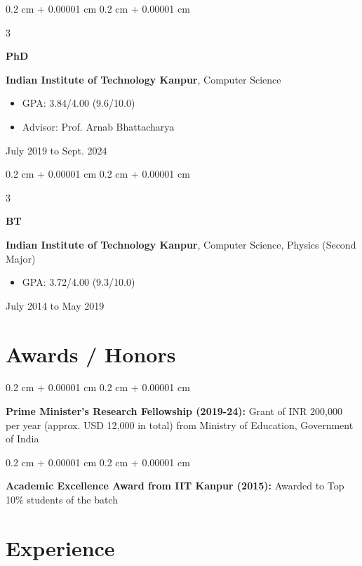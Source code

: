 \documentclass[12pt, letterpaper]{article}
\newenvironment{highlights}{
    \begin{itemize}[
        topsep=0.10 cm,
        parsep=0.10 cm,
        partopsep=0pt,
        itemsep=0pt,
        leftmargin=0.4 cm + 10pt
    ]
}{
    \end{itemize}
} %
\newenvironment{onecolentry}{
    \begin{adjustwidth}{
        0.2 cm + 0.00001 cm
    }{
        0.2 cm + 0.00001 cm
    }
}{
    \end{adjustwidth}
} %
\newenvironment{threecolentry}[3][]{
    \onecolentry
    \def\thirdColumn{#3}
    \setcolumnwidth{1 cm, \fill, 4.5 cm}
    \begin{paracol}{3}
    {\raggedright #2} \switchcolumn
}{
    \switchcolumn \raggedleft \thirdColumn
    \end{paracol}
    \endonecolentry
} %
\begin{document}
        
        \begin{threecolentry}{\textbf{PhD}}{
            July 2019 to Sept. 2024
        }
            \textbf{Indian Institute of Technology Kanpur}, Computer Science
            \begin{highlights}
                \item GPA: 3.84/4.00 (9.6/10.0)
                \item Advisor: Prof. Arnab Bhattacharya
            \end{highlights}
        \end{threecolentry}

        \vspace{0.2 cm}

        \begin{threecolentry}{\textbf{BT}}{
            July 2014 to May 2019
        }
            \textbf{Indian Institute of Technology Kanpur}, Computer Science, Physics (Second Major)
            \begin{highlights}
                \item GPA: 3.72/4.00 (9.3/10.0)
            \end{highlights}
        \end{threecolentry}


    
    \section{Awards / Honors}



        
        \begin{onecolentry}
            \textbf{Prime Minister's Research Fellowship (2019-24):} Grant of INR 200,000 per year (approx. USD 12,000 in total) from Ministry of Education, Government of India
        \end{onecolentry}

        \vspace{0.2 cm}

        \begin{onecolentry}
            \textbf{Academic Excellence Award from IIT Kanpur (2015):} Awarded to Top 10\% students of the batch
        \end{onecolentry}


    
    \section{Experience}
\end{document}
